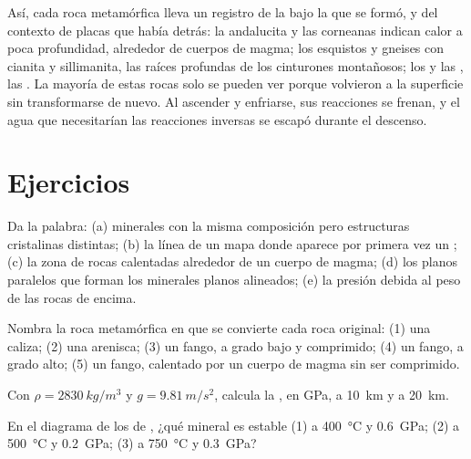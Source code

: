 Así, cada roca metamórfica lleva un registro de la  bajo la que se
formó, y del contexto de placas que había detrás: la andalucita y las
corneanas indican calor a poca profundidad, alrededor de cuerpos de magma; los
esquistos y gneises con cianita y sillimanita, las raíces profundas de los
cinturones montañosos; los  y las , las . La mayoría de estas rocas solo se pueden ver porque volvieron a
la superficie sin transformarse de nuevo. Al ascender y enfriarse, sus
reacciones se frenan, y el agua que necesitarían las reacciones inversas se
escapó durante el descenso.

\section{Ejercicios}

\begin{exercise}[$\star$]\label{exo:g12:metamorphic-rocks:1}
Da la palabra: (a) minerales con la misma composición pero estructuras
cristalinas distintas; (b) la línea de un mapa donde aparece por primera vez
un ; (c) la zona de rocas calentadas alrededor de un cuerpo de
magma; (d) los planos paralelos que forman los minerales planos alineados;
(e) la presión debida al peso de las rocas de encima.
\end{exercise}

\begin{exercise}[$\star$]\label{exo:g12:metamorphic-rocks:2}
Nombra la roca metamórfica en que se convierte cada roca original: (1) una
caliza; (2) una arenisca; (3) un fango, a grado bajo y comprimido; (4) un
fango, a grado alto; (5) un fango, calentado por un cuerpo de magma sin ser
comprimido.
\end{exercise}

\begin{exercise}[$\star$]\label{exo:g12:metamorphic-rocks:3}
Con $\rho = \qty{2830}{kg/m^3}$ y $g = \qty{9.81}{m/s^2}$, calcula la
, en \unit{GPa}, a \qty{10}{km} y a \qty{20}{km}.
\end{exercise}

\begin{exercise}[$\star$]\label{exo:g12:metamorphic-rocks:4}
En el diagrama de los  de , ¿qué mineral es estable
(1) a \qty{400}{\celsius} y \qty{0.6}{GPa}; (2) a \qty{500}{\celsius}
y \qty{0.2}{GPa}; (3) a \qty{750}{\celsius} y \qty{0.3}{GPa}?
\end{exercise}

